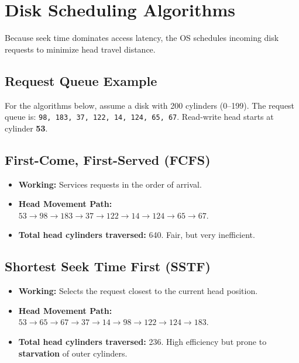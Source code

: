 \documentclass[12pt,a4paper]{article}
\begin{document}
\section{Disk Scheduling Algorithms}

Because seek time dominates access latency, the OS schedules incoming disk requests to minimize head travel distance.

\subsection*{Request Queue Example}
For the algorithms below, assume a disk with 200 cylinders (0–199). The request queue is:
\texttt{98, 183, 37, 122, 14, 124, 65, 67}. Read-write head starts at cylinder \textbf{53}.

\subsection{First-Come, First-Served (FCFS)}
\begin{itemize}[leftmargin=*, itemsep=3pt]
  \item \textbf{Working:} Services requests in the order of arrival.
  \item \textbf{Head Movement Path:} $53 \to 98 \to 183 \to 37 \to 122 \to 14 \to 124 \to 65 \to 67$.
  \item \textbf{Total head cylinders traversed:} 640. Fair, but very inefficient.
\end{itemize}

\subsection{Shortest Seek Time First (SSTF)}
\begin{itemize}[leftmargin=*, itemsep=3pt]
  \item \textbf{Working:} Selects the request closest to the current head position.
  \item \textbf{Head Movement Path:} $53 \to 65 \to 67 \to 37 \to 14 \to 98 \to 122 \to 124 \to 183$.
  \item \textbf{Total head cylinders traversed:} 236. High efficiency but prone to \textbf{starvation} of outer cylinders.
\end{itemize}
\end{document}
